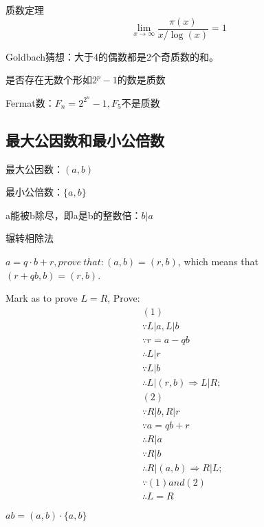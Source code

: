\documentclass[UTF8]{../09-Mathematics}
\begin{document}
\begin{proposition}
    质数定理
    $$  \lim_{x \to \infty} \frac{\pi(x)}{x/ \log (x)}  =1  $$
\end{proposition}


\begin{proposition}
    Goldbach猜想：大于4的偶数都是2个奇质数的和。
\end{proposition}


是否存在无数个形如$2^p-1$的数是质数


Fermat数：$F_n = 2^{2^{n}}-1, F_5$不是质数


\subsection{最大公因数和最小公倍数}

最大公因数：$(a, b)$

最小公倍数：$\{a, b\}$

a能被b除尽，即a是b的整数倍：$b|a$

辗转相除法

$a = q \cdot b + r, prove \ that:(a,b) = (r,b)$, which means that $(r+qb, b) = (r, b)$.

Mark as to prove $L =R$, Prove:
\begin{equation}
    \begin{aligned}
        &(1)\\
        &\because L|a, L|b\\
        &\because r = a-qb\\
        &\therefore L|r\\
        &\because L|b\\
        &\therefore L|(r,b) \Rightarrow L|R;\\
        &(2)\\
        &\because R|b, R|r\\
        &\because a = qb + r\\
        &\therefore R|a\\
        &\because R|b\\
        &\therefore R|(a,b) \Rightarrow R|L;\\
        &\because (1) and (2)\\
        &\therefore L = R
    \end{aligned}
\end{equation}

\begin{proposition}
     $ab = (a,b) \cdot \{a, b\}$
\end{proposition}
\end{document}
